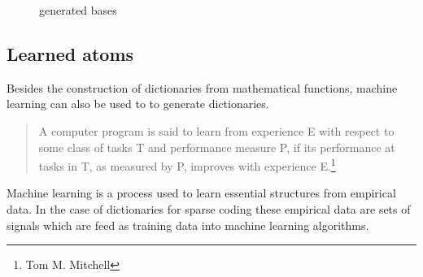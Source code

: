 \begin{figure}
\centering
{}
\hspace{5mm}
\hspace{5mm}
\caption{generated bases}

\label{fig:16_1000_lasso}
\end{figure}



\subsection{Learned atoms}


Besides the construction of dictionaries from mathematical functions, machine
learning can also be used to to generate dictionaries.
\begin{quotation}
A computer program is said to learn from experience E with respect to
some class of tasks T and performance measure P, if its performance at tasks in
T, as measured by P, improves with experience E.\footnote{Tom M. Mitchell}
\end{quotation}
Machine learning is a process used to learn essential structures from
empirical data. In the case of dictionaries for sparse coding these empirical
data are sets of signals which are feed as training data into machine learning
algorithms.


